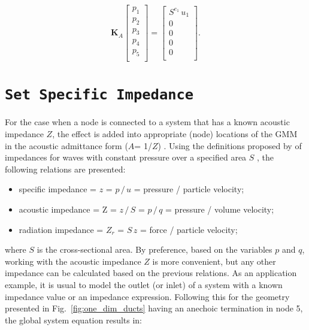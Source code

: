 \documentclass[12pt]{article}
\begin{document}
\begin{equation} \label{eq:global_mobility_matrix_BC}
	\mathbf{K}_{A}
	\begin{bmatrix}
		p_1 \\
		p_2 \\
		p_3 \\
		p_4 \\
		p_5 \\
	\end{bmatrix}
	=
	\begin{bmatrix}
		S^{e_1} \, u_1 \\
		0 \\
		0 \\
		0 \\
		0 \\
	\end{bmatrix}.
\end{equation}

\section{\texttt{Set Specific Impedance}}

For the case when a node is connected to a system that has a known acoustic impedance $Z$, the effect is added into appropriate (node) locations of the \acrshort{GMM} \cite{craggs1990} in the acoustic admittance form ($A$= 1/$Z$) . Using the definitions proposed by \cite{kinsler2000fundamentals} of impedances for waves with constant pressure over a specified area $S$ \cite{blackstock2000fundamentals}, the following relations are presented: 

\begin{itemize}
	\item specific impedance = $z$ = $ p \, / \,  u$ = pressure / particle velocity;
	\item acoustic impedance = Z = $z \, / \, S$ = $p \, / \, q$ = pressure / volume velocity;
	\item radiation impedance = $Z_r$ = $S \, z$ = force / particle velocity;
\end{itemize}

\noindent where $S$ is the cross-sectional area. By preference, based on the variables $p$ and $q$, working with the acoustic impedance $Z$ is more convenient, but any other impedance can be calculated based on the previous relations. As an application example, it is usual to model  the outlet (or inlet) of a system with a known impedance value or an impedance expression. Following this for the geometry presented in Fig.~\ref{fig:one_dim_ducts} having an anechoic termination  in node 5, the global system equation results in:
\end{document}
